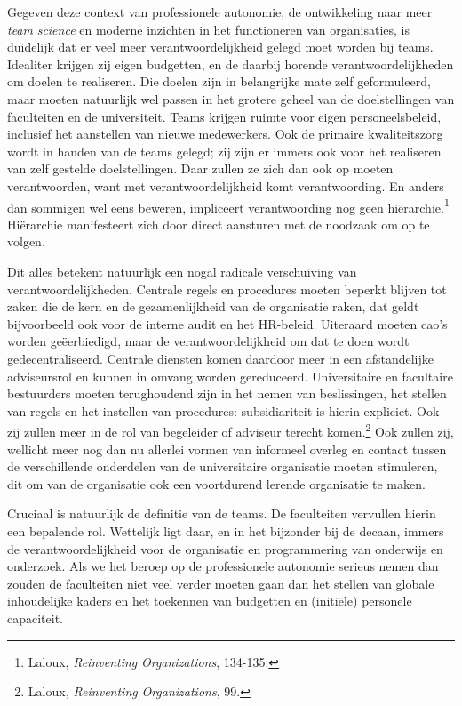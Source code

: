 \documentclass[smallauthor, chapterhaspagenum, nochapterinheader, pagenuminheader,  bigchapnum,medium2, tocpages, garamond, titleinheader]{jote-book}
\begin{document}
	Gegeven deze context van professionele autonomie, de ontwikkeling naar meer \emph{team }\emph{science} en moderne inzichten in het functioneren van organisaties, is duidelijk dat er veel meer verantwoordelijkheid gelegd moet worden bij teams. Idealiter krijgen zij eigen budgetten, en de daarbij horende verantwoordelijkheden om doelen te realiseren. Die doelen zijn in belangrijke mate zelf geformuleerd, maar moeten natuurlijk wel passen in het grotere geheel van de doelstellingen van faculteiten en de universiteit. Teams krijgen ruimte voor eigen personeelsbeleid, inclusief het aanstellen van nieuwe medewerkers. Ook de primaire kwaliteitszorg wordt in handen van de teams gelegd; zij zijn er immers ook voor het realiseren van zelf gestelde doelstellingen. Daar zullen ze zich dan ook op moeten verantwoorden, want met verantwoordelijkheid komt verantwoording. En anders dan sommigen wel eens beweren, impliceert verantwoording nog geen hiërarchie.\footnote{Laloux, \emph{Reinventing}\emph{ }\emph{Organizations}, 134-135.} Hiërarchie manifesteert zich door direct aansturen met de noodzaak om op te volgen.



	Dit alles betekent natuurlijk een nogal radicale verschuiving van verantwoordelijkheden. Centrale regels en procedures moeten beperkt blijven tot zaken die de kern en de gezamenlijkheid van de organisatie raken, dat geldt bijvoorbeeld ook voor de interne audit en het HR-beleid. Uiteraard moeten cao's worden geëerbiedigd, maar de verantwoordelijkheid om dat te doen wordt gedecentraliseerd. Centrale diensten komen daardoor meer in een afstandelijke adviseursrol en kunnen in omvang worden gereduceerd. Universitaire en facultaire bestuurders moeten terughoudend zijn in het nemen van beslissingen, het stellen van regels en het instellen van procedures: subsidiariteit is hierin expliciet. Ook zij zullen meer in de rol van begeleider of adviseur terecht komen.\footnote{Laloux\emph{,} \emph{Reinventing}\emph{ }\emph{Organizations}, 99.} Ook zullen zij, wellicht meer nog dan nu allerlei vormen van informeel overleg en contact tussen de verschillende onderdelen van de universitaire organisatie moeten stimuleren, dit om van de organisatie ook een voortdurend lerende organisatie te maken.



	Cruciaal is natuurlijk de definitie van de teams. De faculteiten vervullen hierin een bepalende rol. Wettelijk ligt daar, en in het bijzonder bij de decaan, immers de verantwoordelijkheid voor de organisatie en programmering van onderwijs en onderzoek. Als we het beroep op de professionele autonomie serieus nemen dan zouden de faculteiten niet veel verder moeten gaan dan het stellen van globale inhoudelijke kaders en het toekennen van budgetten en (initiële) personele capaciteit.
\end{document}

